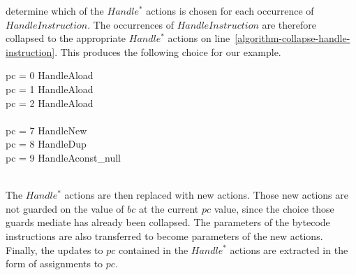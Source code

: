 determine which of the $Handle^*$ actions is chosen for each
occurrence of $HandleInstruction$.
The occurrences of $HandleInstruction$ are therefore collapsed to the
appropriate $Handle^*$ actions on line~\ref{algorithm-collapse-handle-instruction}.
This produces the following choice for our example.
\begin{circus}
  \circif pc = 0 \circthen HandleAload \\
  {} \circelse pc = 1 \circthen HandleAload \\
  {} \circelse pc = 2 \circthen HandleAload \\
  {} \cdots {} \\
  {} \circelse pc = 7 \circthen HandleNew \\
  {} \circelse pc = 8 \circthen HandleDup \\
  {} \circelse pc = 9 \circthen HandleAconst\_null \\
  {} \cdots {} \\
  \circfi
\end{circus}
The $Handle^*$ actions are then replaced with new actions.
Those new actions are not guarded on the value of $bc$ at the
current $pc$ value, since the choice those guards mediate has already
been collapsed.
The parameters of the bytecode instructions are also transferred to
become parameters of the new actions.
Finally, the updates to $pc$ contained in the $Handle^*$ actions are
extracted in the form of assignments to $pc$.


